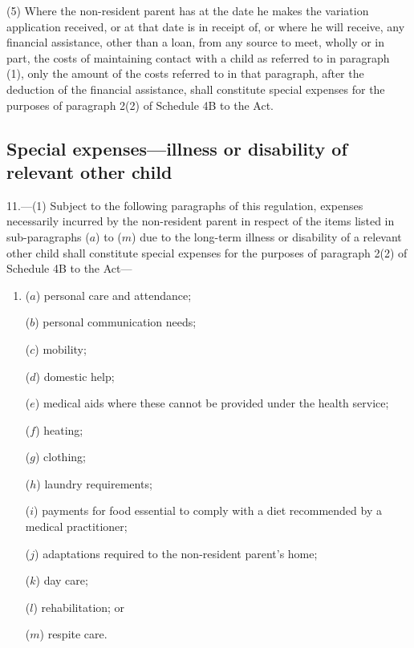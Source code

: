 \documentclass[12pt,a4paper]{article}
\begin{document}
(5) Where the non-resident parent has at the date he makes the variation application received, or at that date is in receipt of, or where he will receive, any financial assistance, other than a loan, from any source to meet, wholly or in part, the costs of maintaining contact with a child as referred to in paragraph (1), only the amount of the costs referred to in that paragraph, after the deduction of the financial assistance, shall constitute special expenses for the purposes of paragraph 2(2) of Schedule 4B to the Act.

\subsection[11. Special expenses—illness or disability of relevant other child]{\sloppy Special expenses—illness or disability of relevant other child}

11.---(1)  Subject to the following paragraphs of this regulation, expenses necessarily incurred by the non-resident parent in respect of the items listed in sub-paragraphs ($a$)  to ($m$)  due to the long-term illness or disability of a relevant other child shall constitute special expenses for the purposes of paragraph 2(2) of Schedule 4B to the Act—
\begin{enumerate}\item[]
($a$) personal care and attendance;

($b$) personal communication needs;

($c$) mobility;

($d$) domestic help;

($e$) medical aids where these cannot be provided under the health service;

($f$) heating;

($g$) clothing;

($h$) laundry requirements;

($i$) payments for food essential to comply with a diet recommended by a medical practitioner;

($j$) adaptations required to the non-resident parent’s home;

($k$) day care;

($l$) rehabilitation; or

($m$) respite care.
\end{enumerate}
\end{document}
